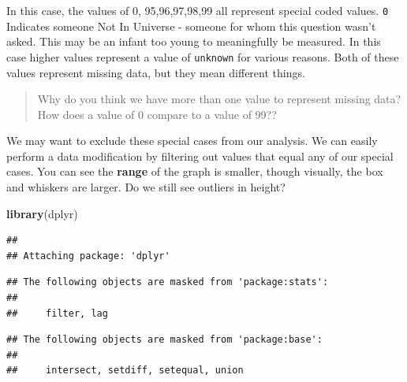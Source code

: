 \documentclass[
]{book}
\newenvironment{Shaded}{\begin{snugshade}}{\end{snugshade}}
\newcommand{\DecValTok}[1]{\textcolor[rgb]{0.00,0.00,0.81}{#1}}
\newcommand{\FunctionTok}[1]{\textcolor[rgb]{0.13,0.29,0.53}{\textbf{#1}}}
\newcommand{\NormalTok}[1]{#1}
\newcommand{\OtherTok}[1]{\textcolor[rgb]{0.56,0.35,0.01}{#1}}
\newcommand{\SpecialCharTok}[1]{\textcolor[rgb]{0.81,0.36,0.00}{\textbf{#1}}}
\begin{document}
In this case, the values of 0, 95,96,97,98,99 all represent special coded values. \texttt{0} Indicates someone Not In Universe - someone for whom this question wasn't asked. This may be an infant too young to meaningfully be measured. In this case higher values represent a value of \texttt{unknown} for various reasons. Both of these values represent missing data, but they mean different things.

\begin{quote}
Why do you think we have more than one value to represent missing data? How does a value of 0 compare to a value of 99??
\end{quote}

We may want to exclude these special cases from our analysis. We can easily perform a data modification by filtering out values that equal any of our special cases. You can see the \textbf{range} of the graph is smaller, though visually, the box and whiskers are larger. Do we still see outliers in height?

\begin{Shaded}
\begin{Highlighting}[]
\FunctionTok{library}\NormalTok{(dplyr)}
\end{Highlighting}
\end{Shaded}

\begin{verbatim}
## 
## Attaching package: 'dplyr'
\end{verbatim}

\begin{verbatim}
## The following objects are masked from 'package:stats':
## 
##     filter, lag
\end{verbatim}

\begin{verbatim}
## The following objects are masked from 'package:base':
## 
##     intersect, setdiff, setequal, union
\end{verbatim}

\begin{Shaded}
\end{Shaded}
\end{document}
